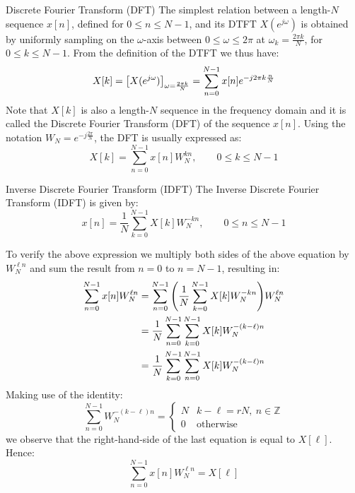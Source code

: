 \documentclass[../../main/main.tex]{subfiles}
\begin{document}
\begin{definition}{Discrete Fourier Transform (DFT)}{}
    The simplest relation between a length-\( N \) sequence \( x[n] \), defined for \( 0 \le n \le N-1 \), and its DTFT \( X(e^{j\omega}) \) is obtained by uniformly sampling on the \( \omega \)-axis between \( 0 \le \omega \le 2\pi \) at \( \omega_{k} = \frac{2\pi k}{N} \), for \( 0 \le k \le N-1 \). From the definition of the DTFT we thus have:
    \begin{equation}
        X[k]
        =
        \qty[X(e^{j\omega})]_{\omega=\frac{2\pi k}{N}}
        =
        \sum_{n=0}^{N-1} x[n]e^{-j 2\pi k \frac{n}{N}}
        \label{eq:L12_S06_1}
    \end{equation}
    Note that \( X[k] \) is also a length-\( N \) sequence in the frequency domain and it is called the Discrete Fourier Transform (DFT) of the sequence \( x[n] \). Using the notation \( W_{N} = e^{-j \frac{2\pi}{N}} \), the DFT is usually expressed as:
    \begin{equation}
        X[k]
        =
        \sum_{n=0}^{N-1} x[n] W_{N}^{kn},
        \qquad
        0 \le k \le N-1
        \label{eq:L12_S07_1}
    \end{equation}
\end{definition}

\begin{definition}{Inverse Discrete Fourier Transform (IDFT)}{}
    The Inverse Discrete Fourier Transform (IDFT) is given by:
    \begin{equation}
        x[n]
        =
        \frac{1}{N} \sum_{k=0}^{N-1} X[k] W_{N}^{-kn},
        \qquad
        0 \le n \le N-1
        \label{eq:L12_S08_1}
    \end{equation}
\end{definition}
To verify the above expression we multiply both sides of the above equation by \( W_{N}^{\ell n} \) and sum the result from \( n=0 \) to \( n=N-1 \), resulting in:
\begin{align}
    \sum_{n=0}^{N-1} x[n] W_{N}^{\ell n}
    &=
        \sum_{n=0}^{N-1} \qty(\frac{1}{N} \sum_{k=0}^{N-1} X[k] W_{N}^{-kn}) W_{N}^{\ell n} \nonumber   \\
    &=
        \frac{1}{N} \sum_{n=0}^{N-1} \sum_{k=0}^{N-1} X[k] W_{N}^{-(k-\ell)n}   \nonumber   \\
    &=
        \frac{1}{N} \sum_{k=0}^{N-1} \sum_{n=0}^{N-1} X[k] W_{N}^{-(k-\ell)n}
\end{align}
Making use of the identity:
\begin{equation}
    \sum_{n=0}^{N-1} W_{N}^{-(k-\ell)n}
    =
    \begin{cases}
        N   &   k-\ell = rN, \ n \in \mathbb{Z} \\
        0   &   \text{otherwise}
    \end{cases}
    \label{eq:L12_S10_1}
\end{equation}
we observe that the right-hand-side of the last equation is equal to \( X[\ell] \). Hence:
\begin{equation}
    \sum_{n=0}^{N-1} x[n] W_{N}^{\ell n}
    =
    X[\ell]
    \label{eq:L12_S10_2}
\end{equation}
\end{document}
